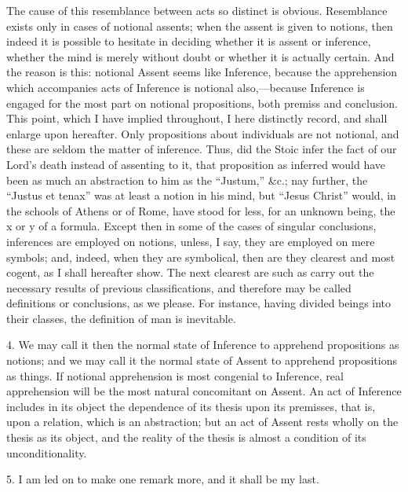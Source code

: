The cause of this resemblance between acts so distinct is obvious.
Resemblance exists only in cases of notional assents; when the assent
is given to notions, then indeed it is possible to hesitate in
deciding whether it is assent or inference, whether the mind is merely
without doubt or whether it is actually certain. And the reason is
this: notional Assent seems like Inference, because the apprehension
which accompanies acts of Inference is notional also,—because
Inference is engaged for the most part on notional propositions, both
premiss and conclusion. This point, which I have implied throughout, I
here distinctly record, and shall enlarge upon hereafter. Only
propositions about individuals are not notional, and these are seldom
the matter of inference. Thus, did the Stoic infer the fact of our
Lord's death instead of assenting to it, that proposition as inferred
would have been as much an abstraction to him as the ``Justum,''
\&c.; nay further, the ``Justus et tenax'' was at least a
notion in his mind, but ``Jesus Christ'' would, in the schools
of Athens or of Rome, have stood for less, for an unknown being, the x
or y of a formula. Except then in some of the cases of singular
conclusions, inferences are employed on notions, unless, I say, they
are employed on mere symbols; and, indeed, when they are symbolical,
then are they clearest and most cogent, as I shall hereafter show. The
next clearest are such as carry out the necessary results of previous
classifications, and therefore may be called definitions or
conclusions, as we please. For instance, having divided beings
into their classes, the definition of man is inevitable.

4. We may call it then the normal state of Inference to apprehend
propositions as notions; and we may call it the normal state of Assent
to apprehend propositions as things. If notional apprehension is most
congenial to Inference, real apprehension will be the most natural
concomitant on Assent. An act of Inference includes in its object the
dependence of its thesis upon its premisses, that is, upon a relation,
which is an abstraction; but an act of Assent rests wholly on the
thesis as its object, and the reality of the thesis is almost a
condition of its unconditionality.

5. I am led on to make one remark more, and it shall be my last.

